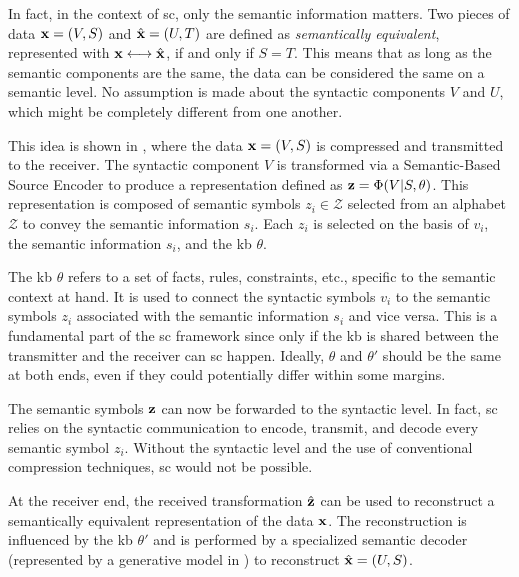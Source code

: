 In fact, in the context of \gls{sc}, only the semantic information matters. Two pieces of data $\mathbf{x}=(V,S)$ and $\hat{\mathbf{x}}=(U,T)$ are defined as \textit{semantically equivalent}, represented with $\mathbf{x} \longleftrightarrow \hat{\mathbf{x}}$, if and only if $S=T$. This means that as long as the semantic components are the same, the data can be considered the same on a semantic level. No assumption is made about the syntactic components $V$ and $U$, which might be completely different from one another.

This idea is shown in , where the data $\mathbf{x}=(V,S)$ is compressed and transmitted to the receiver. The syntactic component $V$ is transformed via a Semantic-Based Source Encoder to produce a representation defined as $\mathbf{z}=\Phi(V|S,\theta)$. This representation is composed of semantic symbols $z_i\in \mathcal{Z}$ selected from an alphabet $\mathcal{Z}$ to convey the semantic information $s_i$. Each $z_i$ is selected on the basis of $v_i$, the semantic information $s_i$, and the \gls{kb} $\theta$.

The \gls{kb} $\theta$ refers to a set of facts, rules, constraints, etc., specific to the semantic context at hand. It is used to connect the syntactic symbols $v_i$ to the semantic symbols $z_i$ associated with the semantic information $s_i$ and vice versa. This is a fundamental part of the \gls{sc} framework since only if the \gls{kb} is shared between the transmitter and the receiver can \gls{sc} happen. Ideally, $\theta$ and $\theta'$ should be the same at both ends, even if they could potentially differ within some margins.

The semantic symbols $\mathbf{z}$ can now be forwarded to the syntactic level. In fact, \gls{sc} relies on the syntactic communication to encode, transmit, and decode every semantic symbol $z_i$. Without the syntactic level and the use of conventional compression techniques, \gls{sc} would not be possible.

At the receiver end, the received transformation $\hat{\mathbf{z}}$ can be used to reconstruct a semantically equivalent representation of the data $\mathbf{x}$. The reconstruction is influenced by the \gls{kb} $\theta'$ and is performed by a specialized semantic decoder (represented by a generative model in ) to reconstruct $\hat{\mathbf{x}}=(U,S)$.

